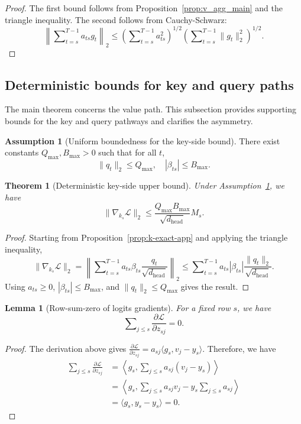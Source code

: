 \documentclass{article}
\theoremstyle{plain}
\newtheorem{theorem}{Theorem}
\newtheorem{lemma}{Lemma}
\theoremstyle{definition}
\newtheorem{assumption}{Assumption}
\theoremstyle{remark}
\begin{document}
\begin{proof}
The first bound follows from Proposition~\ref{prop:v_agg_main} and the triangle inequality. The second follows from Cauchy-Schwarz:
\[
    \left\|\sum\nolimits_{t=s}^{T-1} a_{ts} g_t\right\|_2
    \le \left(\sum\nolimits_{t=s}^{T-1} a_{ts}^2\right)^{1/2} \left(\sum\nolimits_{t=s}^{T-1} \|g_t\|_2^2\right)^{1/2}.
\]
\end{proof}

\subsection{Deterministic bounds for key and query paths}\label{app:theory:kq}

The main theorem concerns the value path. This subsection provides supporting bounds for the key and query pathways and clarifies the asymmetry.

\begin{assumption}[Uniform boundedness for the key-side bound]\label{assump:k-bounded-app}
There exist constants $Q_{\max}, B_{\max} > 0$ such that for all $t$,
\[
    \|q_t\|_2 \le Q_{\max},
    \quad
    |\beta_{ts}| \le B_{\max}.
\]
\end{assumption}

\begin{theorem}[Deterministic key-side upper bound]\label{thm:k-bound-app}
Under Assumption~\ref{assump:k-bounded-app}, we have
\[
    \|\nabla_{k_s} \mathcal{L}\|_2 \le \frac{Q_{\max} B_{\max}}{\sqrt{d_{\mathrm{head}}}} M_s.
\]
\end{theorem}

\begin{proof}
Starting from Proposition~\ref{prop:k-exact-app} and applying the triangle inequality,
\[
    \|\nabla_{k_s} \mathcal{L}\|_2
    = \left\|\sum\nolimits_{t=s}^{T-1} a_{ts}\beta_{ts} \frac{q_t}{\sqrt{d_{\mathrm{head}}}}\right\|_2
    \le \sum\nolimits_{t=s}^{T-1} a_{ts}|\beta_{ts}|\frac{\|q_t\|_2}{\sqrt{d_{\mathrm{head}}}}.
\]
Using $a_{ts}\ge 0$, $|\beta_{ts}|\le B_{\max}$, and $\|q_t\|_2\le Q_{\max}$ gives the result.
\end{proof}

\begin{lemma}[Row-sum-zero of logits gradients]\label{lem:row-sum-zero-app}
For a fixed row $s$, we have
\[
    \sum\nolimits_{j \le s} \frac{\partial \mathcal{L}}{\partial z_{sj}} = 0.
\]
\end{lemma}

\begin{proof}
The derivation above gives $\frac{\partial \mathcal{L}}{\partial z_{sj}} = a_{sj}\langle g_s, v_j - y_s\rangle$. Therefore, we have
\[\begin{aligned}
    \sum\nolimits_{j \le s} \frac{\partial \mathcal{L}}{\partial z_{sj}}
    &= \left\langle g_s, \sum\nolimits_{j \le s} a_{sj}(v_j - y_s) \right\rangle \\
    &= \left\langle g_s, \sum\nolimits_{j \le s} a_{sj}v_j - y_s \sum\nolimits_{j \le s} a_{sj} \right\rangle \\
    &= \langle g_s, y_s - y_s \rangle = 0.
\end{aligned}\]
\end{proof}
\end{document}
